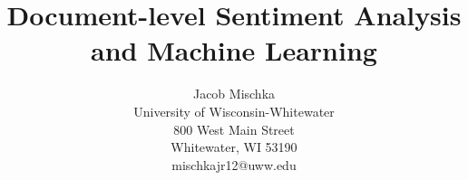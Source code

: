 \documentclass[letterpaper]{article}
\begin{document}
%
\title{Document-level Sentiment Analysis and Machine Learning}
\author{Jacob Mischka\\
University of Wisconsin-Whitewater\\
800 West Main Street\\
Whitewater, WI 53190\\
mischkajr12@uww.edu\\
}
\maketitle
%











\end{document}
